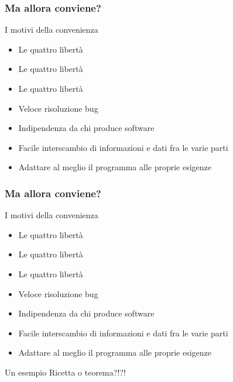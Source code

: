 \documentclass{beamer}
\begin{document}
\begin{frame}
  \frametitle{Ma allora conviene?}


  \begin{block}{I motivi della convenienza}
    
    \begin{itemize}
      \item<1-> Le quattro libert\`a
      \item<2-> Le quattro libert\`a
      \item<3-> Le quattro libert\`a
      \item<4-> Veloce risoluzione bug
      \item<5-> Indipendenza da chi produce software
      \item<6-> Facile interscambio di informazioni e dati fra le
        varie parti
      \item<7-> Adattare al meglio il programma alle proprie esigenze
    \end{itemize}

  \end{block}
  
\end{frame}


\begin{frame}
  \frametitle{Ma allora conviene?}


  \begin{block}{I motivi della convenienza}
    
    \begin{itemize}
      \item Le quattro libert\`a
      \item Le quattro libert\`a
      \item Le quattro libert\`a
      \item Veloce risoluzione bug
      \item Indipendenza da chi produce software
      \item Facile interscambio di informazioni e dati fra le
        varie parti
      \item Adattare al meglio il programma alle proprie esigenze
    \end{itemize}
  \end{block}


  \begin{block}{Un esempio}
    Ricetta o teorema?!?!
  \end{block}


\end{frame}
\end{document}
